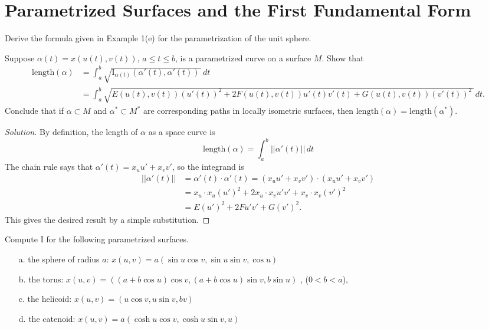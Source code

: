 \documentclass[Shifrin_Solutions_Spring_2018]{subfiles}
\begin{document}
\section{Parametrized Surfaces and the First Fundamental Form}

\begin{exercise}
Derive the formula given in Example 1(e) for the parametrization of the unit sphere.
\end{exercise}




\begin{exercise}
Suppose $\alpha(t) = x(u(t), v(t) )$, $a \leq t \leq b$, is a parametrized curve on a surface $M$. Show that
\[
\begin{split}
\mathrm{length}(\alpha) & = \int_a^b \sqrt{ \mathrm{I}_{\alpha(t)} ( \alpha'(t), \alpha'(t) ) \, } \, dt \\
	& = \int_a^b \sqrt{ E(u(t), v(t)) (u'(t))^2 + 2 F(u(t),v(t)) u'(t) v'(t) + G(u(t),v(t)) (v'(t))^2 \,   } \, dt .
\end{split}
\]
Conclude that if $\alpha \subset M$ and $\alpha^* \subset M^*$ are corresponding paths in locally isometric surfaces, then $\mathrm{length}(\alpha) = \mathrm{length}(\alpha^*)$.
\end{exercise}

\begin{proof}[Solution] By definition, the length of $\alpha$ as a space curve is
\[
\mathrm{length}(\alpha) = \int_a^b ||\alpha'(t) || \, dt
\]
The chain rule says that $\alpha'(t) = x_u u' + x_v v'$, so the integrand is
\[
\begin{split}
||\alpha'(t) || & = \alpha'(t) \cdot \alpha'(t) = \left(x_u u' + x_v v'\right)\cdot \left(x_u u' + x_v v'\right)\\
	& = x_u\cdot x_u (u')^2 + 2 x_u\cdot x_v u' v' + x_v\cdot x_v (v')^2 \\
	& = E (u')^2 + 2F u'v' + G(v')^2.
\end{split}
\]
This gives the desired result by a simple substitution.
\end{proof}

\begin{exercise}
Compute $\mathrm{I}$ for the following parametrized surfaces.
\begin{itemize}
\item[a.] the sphere of radius $a$: $x(u,v) = a ( \sin u \cos v, \sin u \sin v, \cos u )$
\item[b.] the torus: $x(u,v) = ( (a+b\cos u) \cos v , (a + b \cos u) \sin v , b \sin u )$ , ($0<b < a$),
\item[c.] the helicoid: $x(u,v) = (u \cos v , u \sin v, bv )$
\item[d.] the catenoid: $ x(u,v) = a (\cosh u \cos v , \cosh u \sin v, u)$
\end{itemize}
\end{exercise}
\end{document}

